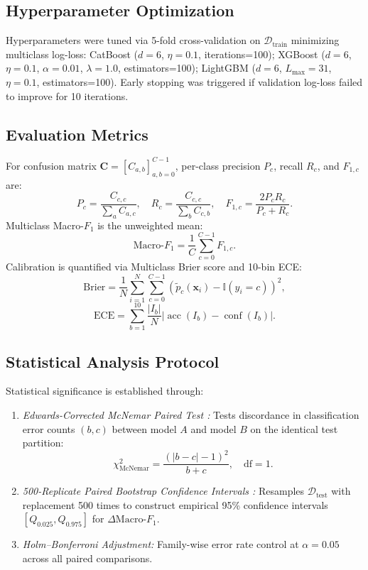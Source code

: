 \documentclass[10pt,journal,twocolumn]{IEEEtran}
\begin{document}
\subsection{Hyperparameter Optimization}
Hyperparameters were tuned via 5-fold cross-validation on $\mathcal{D}_{\text{train}}$ minimizing multiclass log-loss: CatBoost ($d=6$, $\eta=0.1$, iterations=100); XGBoost ($d=6$, $\eta=0.1$, $\alpha=0.01$, $\lambda=1.0$, estimators=100); LightGBM ($d=6$, $L_{\max}=31$, $\eta=0.1$, estimators=100). Early stopping was triggered if validation log-loss failed to improve for 10 iterations.

\subsection{Evaluation Metrics}
For confusion matrix $\mathbf{C} = [C_{a,b}]_{a,b=0}^{C-1}$, per-class precision $P_c$, recall $R_c$, and $F_{1,c}$ are:
\begin{equation}
P_c = \frac{C_{c,c}}{\sum_a C_{a,c}}, \quad R_c = \frac{C_{c,c}}{\sum_b C_{c,b}}, \quad F_{1,c} = \frac{2 P_c R_c}{P_c + R_c}.
\end{equation}
Multiclass Macro-$F_1$ is the unweighted mean:
\begin{equation}
\text{Macro-}F_1 = \frac{1}{C} \sum_{c=0}^{C-1} F_{1,c}.
\end{equation}
Calibration is quantified via Multiclass Brier score and 10-bin ECE:
\begin{equation}
\text{Brier} = \frac{1}{N} \sum_{i=1}^N \sum_{c=0}^{C-1} (\tilde{p}_c(\mathbf{x}_i) - \mathbb{I}(y_i=c))^2,
\end{equation}
\begin{equation}
\text{ECE} = \sum_{b=1}^{10} \frac{|I_b|}{N} |\operatorname{acc}(I_b) - \operatorname{conf}(I_b)|.
\end{equation}

\subsection{Statistical Analysis Protocol}
Statistical significance is established through:
\begin{enumerate}
    \item \emph{Edwards-Corrected McNemar Paired Test \cite{ref17,ref18,ref19}:} Tests discordance in classification error counts $(b, c)$ between model $A$ and model $B$ on the identical test partition:
    \begin{equation}
    \chi^2_{\text{McNemar}} = \frac{(|b - c| - 1)^2}{b + c}, \quad \text{df}=1.
    \end{equation}
    \item \emph{500-Replicate Paired Bootstrap Confidence Intervals \cite{ref20}:} Resamples $\mathcal{D}_{\text{test}}$ with replacement 500 times to construct empirical 95\% confidence intervals $[Q_{0.025}, Q_{0.975}]$ for $\Delta\text{Macro-}F_1$.
    \item \emph{Holm--Bonferroni Adjustment:} Family-wise error rate control at $\alpha=0.05$ across all paired comparisons.
\end{enumerate}
\end{document}
